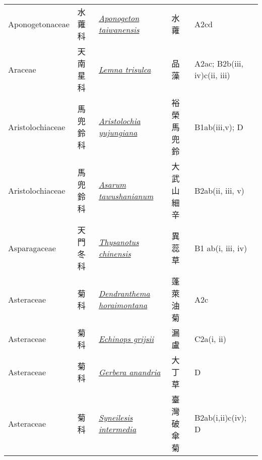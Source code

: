 {\begin{longtable}{L{2.5cm}L{2cm}L{5cm}L{2.5cm}L{3cm}}
    Aponogetonaceae & 水蕹科 & \href{http://www.theplantlist.org/tpl1.1/search?q=Aponogeton+taiwanensis}{\textit{Aponogeton taiwanensis} } & 水蕹 & A2cd    \\
    Araceae & 天南星科 & \href{http://www.theplantlist.org/tpl1.1/search?q=Lemna+trisulca}{\textit{Lemna trisulca} } & 品藻 & A2ac; B2b(iii, iv)c(ii, iii)    \\
    Aristolochiaceae & 馬兜鈴科 & \href{http://www.theplantlist.org/tpl1.1/search?q=Aristolochia+yujungiana}{\textit{Aristolochia yujungiana} } & 裕榮馬兜鈴 & B1ab(iii,v); D    \\
    Aristolochiaceae & 馬兜鈴科 & \href{http://www.theplantlist.org/tpl1.1/search?q=Asarum+tawushanianum}{\textit{Asarum tawushanianum} } & 大武山細辛 & B2ab(ii, iii, v)    \\
    Asparagaceae & 天門冬科 & \href{http://www.theplantlist.org/tpl1.1/search?q=Thysanotus+chinensis}{\textit{Thysanotus chinensis} } & 異蕊草 & B1 ab(i, iii, iv)    \\
    Asteraceae & 菊科 & \href{http://www.theplantlist.org/tpl1.1/search?q=Dendranthema+horaimontana}{\textit{Dendranthema horaimontana} } & 蓬萊油菊 & A2c    \\
    Asteraceae & 菊科 & \href{http://www.theplantlist.org/tpl1.1/search?q=Echinops+grijsii}{\textit{Echinops grijsii} } & 漏盧 & C2a(i, ii)    \\
    Asteraceae & 菊科 & \href{http://www.theplantlist.org/tpl1.1/search?q=Gerbera+anandria}{\textit{Gerbera anandria} } & 大丁草 & D    \\
    Asteraceae & 菊科 & \href{http://www.theplantlist.org/tpl1.1/search?q=Syneilesis+intermedia}{\textit{Syneilesis intermedia} } & 臺灣破傘菊 & B2ab(i,ii)c(iv); D    \\

\end{longtable}}
